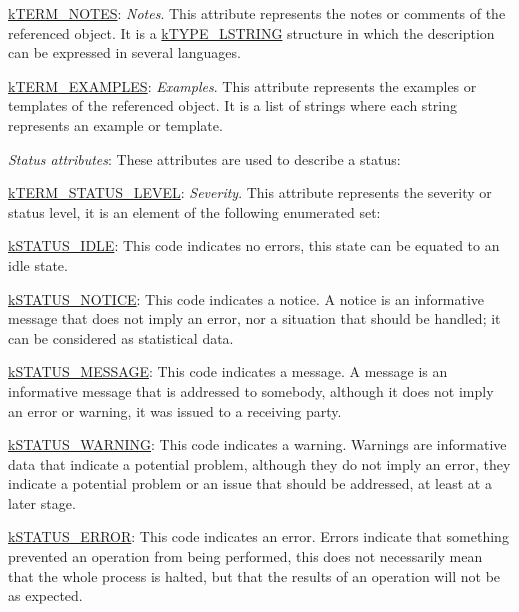 \begin{DoxyItemize}
\begin{DoxyItemize}
\item {\ttfamily \hyperlink{}{k\-T\-E\-R\-M\-\_\-\-N\-O\-T\-E\-S}}\-: {\itshape Notes}. This attribute represents the notes or comments of the referenced object. It is a \hyperlink{}{k\-T\-Y\-P\-E\-\_\-\-L\-S\-T\-R\-I\-N\-G} structure in which the description can be expressed in several languages. 
\item {\ttfamily \hyperlink{}{k\-T\-E\-R\-M\-\_\-\-E\-X\-A\-M\-P\-L\-E\-S}}\-: {\itshape Examples}. This attribute represents the examples or templates of the referenced object. It is a list of strings where each string represents an example or template. 
\end{DoxyItemize}
\item {\itshape Status attributes}\-: These attributes are used to describe a status\-: 
\begin{DoxyItemize}
\item {\ttfamily \hyperlink{}{k\-T\-E\-R\-M\-\_\-\-S\-T\-A\-T\-U\-S\-\_\-\-L\-E\-V\-E\-L}}\-: {\itshape Severity}. This attribute represents the severity or status level, it is an element of the following enumerated set\-: 
\begin{DoxyItemize}
\item {\ttfamily \hyperlink{}{k\-S\-T\-A\-T\-U\-S\-\_\-\-I\-D\-L\-E}}\-: This code indicates no errors, this state can be equated to an idle state. 
\item {\ttfamily \hyperlink{}{k\-S\-T\-A\-T\-U\-S\-\_\-\-N\-O\-T\-I\-C\-E}}\-: This code indicates a notice. A notice is an informative message that does not imply an error, nor a situation that should be handled; it can be considered as statistical data. 
\item {\ttfamily \hyperlink{}{k\-S\-T\-A\-T\-U\-S\-\_\-\-M\-E\-S\-S\-A\-G\-E}}\-: This code indicates a message. A message is an informative message that is addressed to somebody, although it does not imply an error or warning, it was issued to a receiving party. 
\item {\ttfamily \hyperlink{}{k\-S\-T\-A\-T\-U\-S\-\_\-\-W\-A\-R\-N\-I\-N\-G}}\-: This code indicates a warning. Warnings are informative data that indicate a potential problem, although they do not imply an error, they indicate a potential problem or an issue that should be addressed, at least at a later stage. 
\item {\ttfamily \hyperlink{}{k\-S\-T\-A\-T\-U\-S\-\_\-\-E\-R\-R\-O\-R}}\-: This code indicates an error. Errors indicate that something prevented an operation from being performed, this does not necessarily mean that the whole process is halted, but that the results of an operation will not be as expected. 

\end{DoxyItemize}
\end{DoxyItemize}
\end{DoxyItemize}
